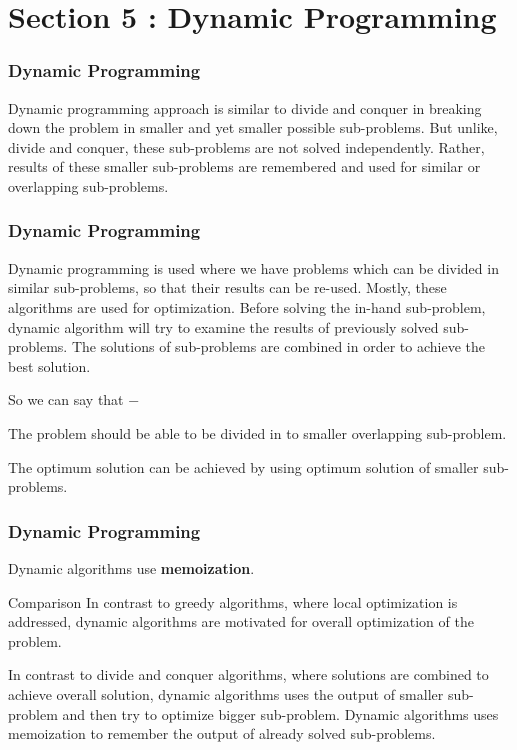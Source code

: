 \documentclass{beamer}
\begin{document}
\section{Section 5 : Dynamic Programming}
\begin{frame}
\frametitle{Dynamic Programming}
\large

Dynamic programming approach is similar to divide and conquer in breaking down the problem in smaller and yet smaller possible sub-problems. But unlike, divide and conquer, these sub-problems are not solved independently. Rather, results of these smaller sub-problems are remembered and used for similar or overlapping sub-problems.
\end{frame}
\begin{frame}
\frametitle{Dynamic Programming}
\large
Dynamic programming is used where we have problems which can be divided in similar sub-problems, so that their results can be re-used. Mostly, these algorithms are used for optimization. Before solving the in-hand sub-problem, dynamic algorithm will try to examine the results of previously solved sub-problems. The solutions of sub-problems are combined in order to achieve the best solution.

So we can say that −

The problem should be able to be divided in to smaller overlapping sub-problem.

The optimum solution can be achieved by using optimum solution of smaller sub-problems.
\end{frame}
\begin{frame}
\frametitle{Dynamic Programming}
\large
Dynamic algorithms use \textbf{memoization}.

Comparison
In contrast to greedy algorithms, where local optimization is addressed, dynamic algorithms are motivated for overall optimization of the problem.

In contrast to divide and conquer algorithms, where solutions are combined to achieve overall solution, dynamic algorithms uses the output of smaller sub-problem and then try to optimize bigger sub-problem. Dynamic algorithms uses memoization to remember the output of already solved sub-problems.
\end{frame}
\end{document}
